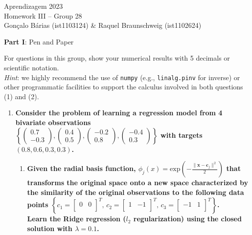 \documentclass[12pt]{article}
\begin{document}
\begin{center}
\large{Aprendizagem 2023} \\
Homework III -- Group 28 \\
\vskip 0.3cm
Gonçalo Bárias (ist1103124) \& Raquel Braunschweig (ist1102624)\vskip 1cm

\large{\textbf{Part I}: Pen and Paper}\normalsize
\end{center}

\noindent For questions in this group, show your numerical results with 5 decimals or scientific notation. \\
\textit{Hint}: we highly recommend the use of \texttt{numpy} (e.g., \texttt{linalg.pinv} for inverse) or other programmatic
facilities to support the calculus involved in both questions (1) and (2).

\begin{enumerate}[leftmargin=\labelsep]
    \item \textbf{Consider the problem of learning a regression model from 4 bivariate observations} \\

          \vskip -0.2cm
          \textbf{$\left\{\begin{pmatrix} 0.7 \\ -0.3 \end{pmatrix}, \begin{pmatrix} 0.4 \\ 0.5 \end{pmatrix}, \begin{pmatrix} -0.2 \\ 0.8 \end{pmatrix},
          \begin{pmatrix} -0.4 \\ 0.3 \end{pmatrix}\right\}$ with targets $(0.8, 0.6, 0.3, 0.3)$.}

    \begin{enumerate}
        \item \textbf{Given the radial basis function, $\phi_j(x) = \text{exp}\left({ -\frac{\| \mathbf{x} - \boldsymbol{c}_j \|^2}{2} }\right)$ that transforms
              the original space onto a new space characterized by the similarity of the original observations to the following data points
              $\left\{ c_1 = \begin{bmatrix} 0 & 0 \\ \end{bmatrix}^T,\, c_2 = \begin{bmatrix} 1 & -1 \\ \end{bmatrix}^T,\, c_3 = \begin{bmatrix} -1 & 1 \\ \end{bmatrix}^T\right\}$. \\
              Learn the Ridge regression ($l_2$ regularization) using the closed solution with $\lambda = 0.1$.}


\end{enumerate}
\end{enumerate}
\end{document}

